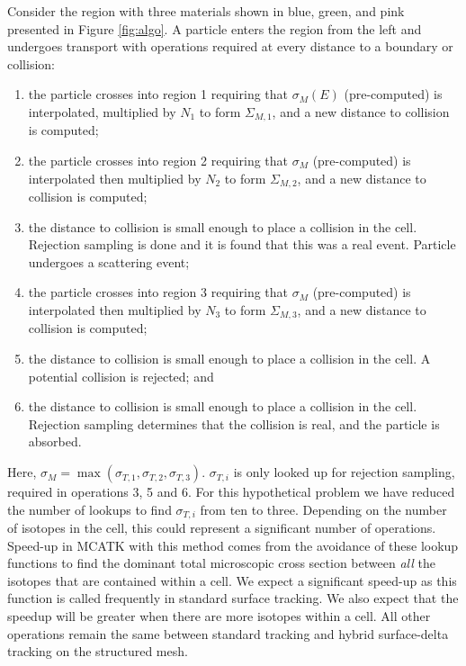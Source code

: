 Consider the region with three materials shown in blue, green, and pink presented in Figure \ref{fig:algo}. A particle enters the region from the left and undergoes transport with operations required at every distance to a boundary or collision:
\begin{enumerate}
    \item the particle crosses into region 1 requiring that $\sigma_M(E)$ (pre-computed) is interpolated, multiplied by $N_{1}$ to form $\Sigma_{M,1}$, and a new distance to collision is computed;
    \item the particle crosses into region 2 requiring that $\sigma_M$ (pre-computed) is interpolated then multiplied by $N_{2}$ to form $\Sigma_{M,2}$, and a new distance to collision is computed;
    \item the distance to collision is small enough to place a collision in the cell. Rejection sampling is done and it is found that this was a real event. Particle undergoes a scattering event;
    \item the particle crosses into region 3 requiring that $\sigma_M$ (pre-computed) is interpolated then multiplied by $N_{3}$ to form $\Sigma_{M,3}$, and a new distance to collision is computed;
    \item the distance to collision  is small enough to place a collision in the cell. A potential collision is rejected; and
    \item the distance to collision  is small enough to place a collision in the cell. Rejection sampling determines that the collision is real, and the particle is absorbed.
\end{enumerate}
Here, $\sigma_M = \max{(\sigma_{T,1}, \sigma_{T,2}, \sigma_{T,3})}$. $\sigma_{T,i}$ is only looked up for rejection sampling, required in operations 3, 5 and 6. For this hypothetical problem we have reduced the number of lookups to find $\sigma_{T,i}$ from ten to three. Depending on the number of isotopes in the cell, this could represent a significant number of operations.
Speed-up in MCATK with this method comes from the avoidance of these lookup functions to find the dominant total microscopic cross section between \textit{all} the isotopes that are contained within a cell. 
We expect a significant speed-up as this function is called frequently in standard surface tracking. 
We also expect that the speedup will be greater when there are more isotopes within a cell. 
All other operations remain the same between standard tracking and hybrid surface-delta tracking on the structured mesh.

